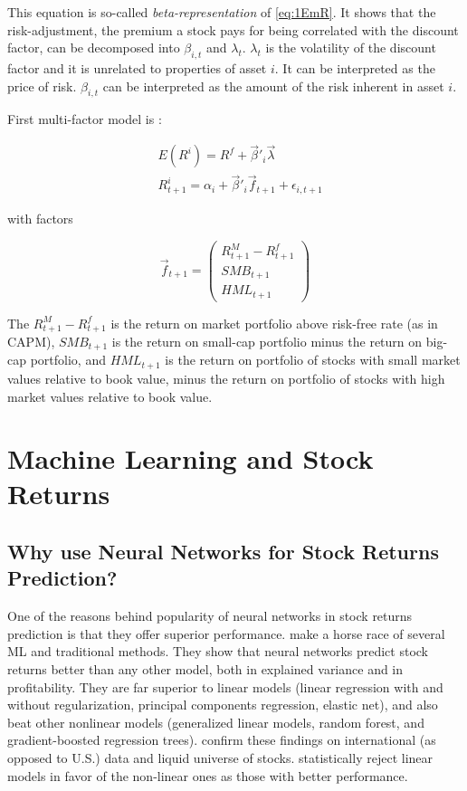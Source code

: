 	 		This equation is so-called \textit{beta-representation} of \ref{eq:1EmR}. It shows that the risk-adjustment, the premium a stock pays for being correlated with the discount factor, can be decomposed into $\beta_{i,t}$ and $\lambda_t$. $\lambda_t$ is the volatility of the discount factor and it is unrelated to properties of asset $i$. It can be interpreted as the price of risk. $\beta_{i,t}$ can be interpreted as the amount of the risk inherent in asset $i$. 
	 		
	 		
	 				
	 		
	 		First multi-factor model is \cite{fama1996multifactor}:
	 		
	 		\begin{align}
	 			& E(R^i) = R^f + \vec{\beta}'_{i} \vec{\lambda} \\
	 			& R^i_{t+1} = \alpha_{i} + \vec{\beta}'_{i} \vec{f}_{t+1} + \epsilon_{i,t+1}
	 		\end{align}
	 		
	 		with factors  
	 		
	 		\begin{equation}
	 			\vec{f}_{t+1} = 
	 			\begin{pmatrix}
	 				R^M_{t+1}-R^f_{t+1} \\
	 				SMB_{t+1} \\
	 				HML_{t+1}				
	 			\end{pmatrix}
	 		\end{equation}
	 		
	 		
	 		The $R^M_{t+1}-R^f_{t+1}$ is the return on market portfolio above risk-free rate (as in CAPM), $SMB_{t+1}$ is the return on small-cap portfolio minus the return on big-cap portfolio, and $HML_{t+1}$ is the return on portfolio of stocks with small market values relative to book value, minus the return on portfolio of stocks with high market values relative to book value.
	 		
			
		\section{Machine Learning and Stock Returns}		
		
		\subsection{Why use Neural Networks for Stock Returns Prediction?}
			
			One of the reasons behind popularity of neural networks in stock returns prediction is that they offer superior performance. \cite{gu2020empirical} make a horse race of several ML and traditional methods. They show that neural networks predict stock returns better than any other model, both in explained variance and in profitability. They are far superior to linear models (linear regression with and without regularization, principal components regression, elastic net), and also beat other nonlinear models (generalized linear models, random forest, and gradient-boosted regression trees). \cite{tobek2020does} confirm these findings on international (as opposed to U.S.) data and liquid universe of stocks. \cite{gu2020empirical} statistically reject linear models in favor of the non-linear ones as those with better performance.
			
